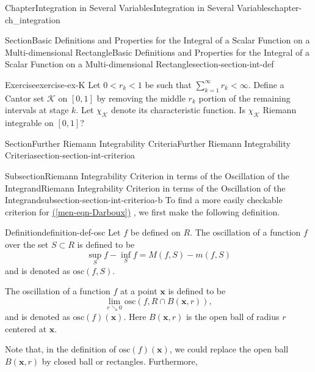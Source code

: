 \documentclass[oneside,10pt,]{book}
\newcommand{\xreffont}{\relax}
\numberwithin{equation}{section}
\newcommand{\bx}{\mathbf{x}}
\newcommand{\cK}{\mathcal{K}}
\newcommand{\osc}{\text{osc}}
\newcommand{\lt}{<}
\begin{document}
\begin{chapterptx}{Chapter}{Integration in Several Variables}{}{Integration in Several Variables}{}{}{chapter-ch_integration}
\begin{sectionptx}{Section}{Basic Definitions and Properties for the Integral of a Scalar Function on a Multi-dimensional Rectangle}{}{Basic Definitions and Properties for the Integral of a Scalar Function on a Multi-dimensional Rectangle}{}{}{section-section-int-def}
\begin{inlineexercise}{Exercise}{}{exercise-ex-K}%
Let \(0 \lt r_{k} \lt 1\) be such that \(\sum_{k=1}^{\infty} r_{k} \lt \infty\). Define a Cantor set \(\cK\) on \([0, 1]\) by removing the middle \(r_{k}\) portion of the remaining intervals at stage \(k\). Let \(\chi_{\cK}\) denote its characteristic function. Is \(\chi_{\cK}\) Riemann integrable on \([0, 1]\)?%
\end{inlineexercise}%
\end{sectionptx}
%
%
\typeout{************************************************}
\typeout{************************************************}
%
\begin{sectionptx}{Section}{Further Riemann Integrability Criteria}{}{Further Riemann Integrability Criteria}{}{}{section-section-int-criterioa}
%
%
\typeout{************************************************}
\typeout{************************************************}
%
\begin{subsectionptx}{Subsection}{Riemann Integrability Criterion in terms of the Oscillation of the Integrand}{}{Riemann Integrability Criterion in terms of the Oscillation of the Integrand}{}{}{subsection-section-int-criterioa-b}
To find a more easily checkable criterion for 	\hyperref[men-eqn-Darboux]{({\xreffont\ref{men-eqn-Darboux}})} , we first make the following definition.%
\begin{definition}{Definition}{}{definition-def-osc}%
%
\label{notation-def-osc-b}%
Let \(f\) be defined on \(R\). The oscillation of a function \(f\) over the set \(S \subset R\) is defined to be%
\begin{equation*}
\sup_{S}f - \inf_{S}f = M(f, S)-m(f, S)
\end{equation*}
and is denoted as \(\osc(f, S)\).%
\par
The oscillation of a function \(f\)  at a point \(\bx\) is defined to be%
\begin{equation*}
\lim_{r\searrow 0} \osc(f, R\cap B(\bx, r)),
\end{equation*}
and is denoted as \(\osc(f)(\bx)\). Here \(B(\bx, r)\) is the open ball of radius \(r\) centered at \(\bx\).%
\end{definition}
Note that, in the definition of \(\osc(f)(\bx)\), we could replace the open ball \(B(\bx, r)\) by closed ball or rectangles. Furthermore,%
\begin{equation*}

\end{equation*}
\end{subsectionptx}
\end{sectionptx}
\end{chapterptx}
\end{document}
